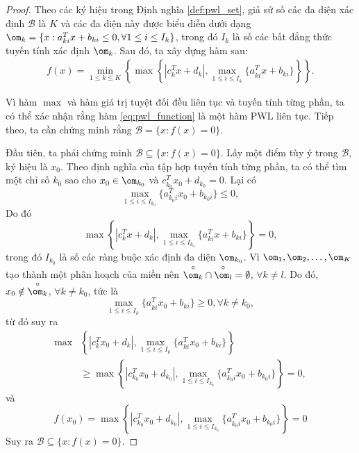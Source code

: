 \begin{proof}
    Theo các ký hiệu trong Định nghĩa \ref{def:pwl_set}, giả sử số các đa diện xác định \( \mathcal{B} \) là \( K \) và các đa diện này được biểu diễn dưới dạng \( \om_k = \{ x : a_{ki}^T x + b_{ki} \leq 0, \forall 1 \leq i \leq I_k \} \), trong đó \( I_k \) là số các bất đẳng thức tuyến tính xác định \( \om_k \). Sau đó, ta xây dựng hàm sau:
    \begin{align}
        f(x) = \min_{1 \leq k \leq K} \left\{ \max \left\{|c_k^T x + d_k|, \max_{1 \leq i \leq I_k} \{ a_{ki}^T x + b_{ki} \} \right\} \right\}.
        \label{eq:pwl_function}
    \end{align}
    
    Vì hàm \( \max \) và hàm giá trị tuyệt đối đều liên tục và tuyến tính từng phần, ta có thể xác nhận rằng hàm \eqref{eq:pwl_function} là một hàm PWL liên tục. Tiếp theo, ta cần chứng minh rằng \( \mathcal{B} = \{ x : f(x) = 0 \} \).

    Đầu tiên, ta phải chứng minh \( \mathcal{B} \subseteq \{ x : f(x) = 0 \} \). Lấy một điểm tùy ý trong \( \mathcal{B} \), ký hiệu là \( x_0 \). Theo định nghĩa của tập hợp tuyến tính từng phần, ta có thể tìm một chỉ số \( k_0 \) sao cho \( x_0 \in \om_{k_0} \) và \( c_{k_0}^T x_0 + d_{k_0} = 0 \). Lại có
    \[
    \max_{1 \leq i \leq I_{k_0}} \{ a_{k_0i}^T x_0 + b_{k_0i} \} \leq 0,
    \]
    Do đó
    \[
        \max \left\{|c_k^T x + d_k|, \max_{1 \leq i \leq I_{k_0}} \{ a_{ki}^T x + b_{ki} \} \right\} = 0,
    \]
    trong đó \(I_{k_0}\) là số các ràng buộc xác định đa diện \(\om_{k_0}\). Vì \( \om_1, \om_2, \ldots, \om_K \) tạo thành một phân hoạch của miền nên \( \overset{\circ}{\om_k} \cap \overset{\circ}{\om_l}= \emptyset \), \( \forall k \neq l\). Do đó, \( x_0 \notin \overset{\circ}{\om_k} \), \( \forall k \neq k_0 \), tức là
    \[
    \max_{1 \leq i \leq I_k} \{ a_{ki}^T x_0 + b_{ki} \} \geq 0, \forall k \neq k_0,
    \]
    từ đó suy ra
    \begin{align*}
        \max &\left\{|c_k^T x_0 + d_k|, \max_{1 \leq i \leq I_k} \{ a_{ki}^T x_0 + b_{ki} \} \right\} \\
    &\geq \max \left\{|c_{k_0}^T x_0 + d_{k_0}|, \max_{1 \leq i \leq I_{k_0}} \{ a_{k_0i}^T x_0 + b_{k_0i} \} \right\} = 0,
    \end{align*}
    và
    \[
    f(x_0) = \max \left\{ |c_{k_0}^T x_0 + d_{k_0}|, \max_{1 \leq i \leq I_{k_0}} \{ a_{k_0i}^T x_0 + b_{k_0i} \} \right\} = 0 
    \]
    Suy ra \( \mathcal{B} \subseteq \{ x : f(x) = 0 \} \).


\end{proof}

